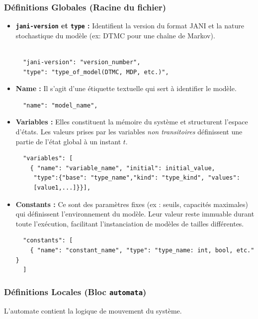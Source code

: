 \documentclass[14pt, a4paper]{extarticle}
\begin{document}
\subsubsection{Définitions Globales (Racine du fichier)}
\begin{itemize}
\item \textbf{\texttt{jani-version} et \texttt{type} :} Identifient la version du format JANI et la nature stochastique du modèle (ex: DTMC pour une chaîne de Markov).
\begin{verbatim}
  
  "jani-version": "version_number", 
  "type": "type_of_model(DTMC, MDP, etc.)",
  \end{verbatim}
\item \textbf{Name :} Il s'agit d'une étiquette textuelle qui sert à identifier le modèle. 
\begin{verbatim}
  "name": "model_name",
\end{verbatim}
\item \textbf{Variables :} Elles constituent la mémoire du système et structurent l'espace d'états. Les valeurs prises par les variables \textit{non transitoires} définissent une partie de l'état global à un instant \(t\).
\begin{verbatim}
  "variables": [
    { "name": "variable_name", "initial": initial_value,
     "type":{"base": "type_name","kind": "type_kind", "values": 
     [value1,...]}}],
\end{verbatim}
\item \textbf{Constants :} Ce sont des paramètres fixes (ex : seuils, capacités maximales) qui définissent l'environnement du modèle. Leur valeur reste immuable durant toute l'exécution, facilitant l'instanciation de modèles de tailles différentes.
\begin{verbatim}
  "constants": [
    { "name": "constant_name", "type": "type_name: int, bool, etc." }
  ]
\end{verbatim}
\end{itemize}


\subsubsection{Définitions Locales (Bloc \texttt{automata})}
L'automate contient la logique de mouvement du système. 
\end{document}
